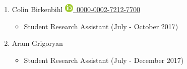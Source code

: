 \documentclass[11pt,a4paper,sans]{moderncv} %
\begin{document}
\begin{enumerate}
        \item
            Colin Birkenbihl {\scriptsize     \href{https://orcid.org/0000-0002-7212-7700}{\includegraphics[scale=0.5]{img/ORCIDiD_icon16x16}\ 0000-0002-7212-7700}
}    \begin{itemize}
        \item
    {\scriptsize Student Research Assistant (July - October 2017)}
    \end{itemize}

        \item
            Aram Grigoryan     \begin{itemize}
        \item
    {\scriptsize Student Research Assistant (July - December 2017)}
    \end{itemize}

    \end{enumerate}
\end{document}
